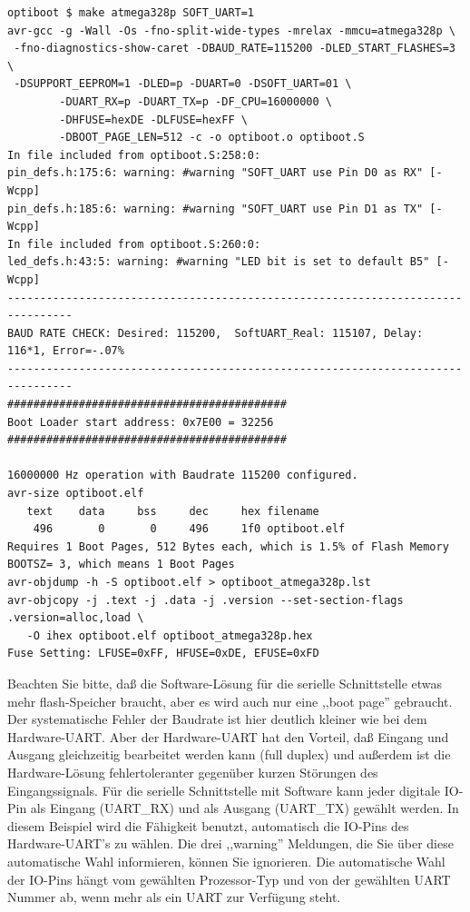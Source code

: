 \begin{verbatim}
optiboot $ make atmega328p SOFT_UART=1
avr-gcc -g -Wall -Os -fno-split-wide-types -mrelax -mmcu=atmega328p \
 -fno-diagnostics-show-caret -DBAUD_RATE=115200 -DLED_START_FLASHES=3 \
 -DSUPPORT_EEPROM=1 -DLED=p -DUART=0 -DSOFT_UART=01 \
        -DUART_RX=p -DUART_TX=p -DF_CPU=16000000 \
        -DHFUSE=hexDE -DLFUSE=hexFF \
        -DBOOT_PAGE_LEN=512 -c -o optiboot.o optiboot.S
In file included from optiboot.S:258:0:
pin_defs.h:175:6: warning: #warning "SOFT_UART use Pin D0 as RX" [-Wcpp]
pin_defs.h:185:6: warning: #warning "SOFT_UART use Pin D1 as TX" [-Wcpp]
In file included from optiboot.S:260:0:
led_defs.h:43:5: warning: #warning "LED bit is set to default B5" [-Wcpp]
--------------------------------------------------------------------------------
BAUD RATE CHECK: Desired: 115200,  SoftUART_Real: 115107, Delay: 116*1, Error=-.07%
--------------------------------------------------------------------------------
###########################################
Boot Loader start address: 0x7E00 = 32256
###########################################

16000000 Hz operation with Baudrate 115200 configured.
avr-size optiboot.elf
   text	   data	    bss	    dec	    hex	filename
    496	      0	      0	    496	    1f0	optiboot.elf
Requires 1 Boot Pages, 512 Bytes each, which is 1.5% of Flash Memory
BOOTSZ= 3, which means 1 Boot Pages
avr-objdump -h -S optiboot.elf > optiboot_atmega328p.lst
avr-objcopy -j .text -j .data -j .version --set-section-flags .version=alloc,load \
   -O ihex optiboot.elf optiboot_atmega328p.hex
Fuse Setting: LFUSE=0xFF, HFUSE=0xDE, EFUSE=0xFD
\end{verbatim}

Beachten Sie bitte, daß die Software-Lösung für die serielle Schnittstelle etwas mehr flash-Speicher braucht,
aber es wird auch nur eine ,,boot page'' gebraucht. Der systematische Fehler der Baudrate ist hier deutlich kleiner
wie bei dem Hardware-UART.
Aber der Hardware-UART hat den Vorteil, daß Eingang und Ausgang gleichzeitig bearbeitet werden kann (full duplex) und 
außerdem ist die Hardware-Lösung fehlertoleranter gegenüber kurzen Störungen des Eingangssignals.
Für die serielle Schnittstelle mit Software kann jeder digitale IO-Pin als Eingang (UART\_RX) und als Ausgang (UART\_TX)
gewählt werden. In diesem Beispiel wird die Fähigkeit benutzt, automatisch die IO-Pins des Hardware-UART's zu wählen.
Die drei ,,warning'' Meldungen, die Sie über diese automatische Wahl informieren, können Sie ignorieren.
Die automatische Wahl der IO-Pins hängt vom gewählten Prozessor-Typ und von der gewählten UART Nummer ab,
wenn mehr als ein UART zur Verfügung steht.

